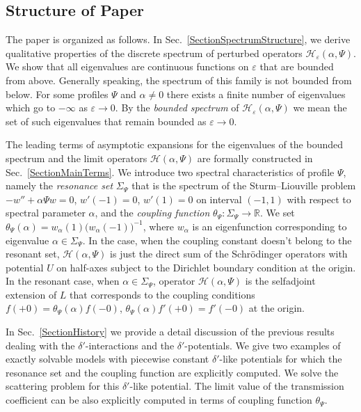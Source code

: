 \documentclass[11pt,english]{amsart}
\begin{document}
\subsection{Structure of Paper}

The paper is organized as follows. In Sec.~\ref{SectionSpectrumStructure}, we derive  qualitative properties of the discrete spectrum of
perturbed operators  $\mathcal{H}_\varepsilon(\alpha,\Psi)$. We show that all eigenvalues are  continuous functions on  $\varepsilon$ that are bounded from above. Generally speaking, the spectrum of this family is not bounded from below. For some profiles $\Psi$ and $\alpha\neq 0$ there exists a finite number of eigenvalues which go to  $-\infty$ as $\varepsilon\to 0$. By the \emph{bounded spectrum} of $\mathcal{H}_\varepsilon(\alpha,\Psi)$ we mean the set of such eigenvalues  that remain bounded as $\varepsilon\to 0$.

The leading terms of asymptotic expansions for the eigenvalues of the bounded spectrum  and the limit operators $\mathcal{H}(\alpha,\Psi)$ are formally constructed in Sec.~\ref{SectionMainTerms}. We introduce two spectral characteristics of profile $\Psi$, namely the \emph{resonance set} $\Sigma_\Psi$ that is the spectrum of the Sturm--Liouville problem $-w''+\alpha \Psi w=0$, $w'(-1)=0$, $w'(1)=0$ on interval $(-1,1)$ with respect to spectral parameter $\alpha$,  and the \emph{coupling function}  $\theta_\Psi
\colon\Sigma_\Psi \to \mathbb{R}$. We set $\theta_\Psi (\alpha)=w_\alpha(1)\bigl(w_\alpha(-1)\bigr)^{-1}$, where
$w_\alpha$ is an eigenfunction corresponding to eigenvalue $\alpha\in \Sigma_\Psi$.
In the case, when the coupling constant doesn't belong to the resonant set, $\mathcal{H}(\alpha,\Psi)$ is just the direct sum  of the  Schr\"odinger operators with potential $U$
on half-axes subject to the Dirichlet boundary condition at the origin.
In the resonant case, when $\alpha\in \Sigma_\Psi$, operator $\mathcal{H}(\alpha,\Psi)$ is the selfadjoint extension of $L$ that corresponds to the coupling conditions
$ f(+0)=\theta_\Psi (\alpha)f(-0)$, $\theta_\Psi
(\alpha)f'(+0)=f'(-0)$ at the origin.

In Sec.~\ref{SectionHistory} we provide a detail discussion of the previous results dealing with
the $\delta'$-interactions and the $\delta'$-potentials.
We give two examples of exactly solvable models with  piecewise constant $\delta'$-like potentials for which
the resonance set and the coupling function are  explicitly computed.
We solve the scattering problem for this $\delta'$-like potential. The limit value of the transmission coefficient
can be also explicitly computed in terms of  coupling function $\theta_\Psi$.
\end{document}
